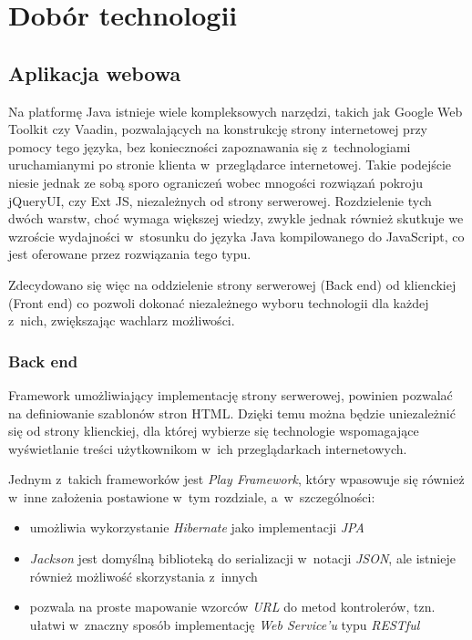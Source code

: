 \documentclass[11pt]{aghdpl}
\begin{document}
\section{Dobór technologii}

\subsection{Aplikacja webowa}

Na platformę Java istnieje wiele kompleksowych narzędzi, takich jak Google Web Toolkit czy Vaadin, pozwalających na konstrukcję strony internetowej przy pomocy tego języka, bez konieczności zapoznawania się z~technologiami uruchamianymi po stronie klienta w~przeglądarce internetowej. Takie podejście niesie jednak ze sobą sporo ograniczeń wobec mnogości rozwiązań pokroju jQueryUI, czy Ext JS, niezależnych od strony serwerowej. Rozdzielenie tych dwóch warstw, choć wymaga większej wiedzy, zwykle jednak również skutkuje we wzroście wydajności w~stosunku do języka Java kompilowanego do JavaScript, co jest oferowane przez rozwiązania tego typu.

Zdecydowano się więc na oddzielenie strony serwerowej (Back end) od klienckiej (Front end) co pozwoli dokonać niezależnego wyboru technologii dla każdej z~nich, zwiększając wachlarz możliwości.

\subsubsection{Back end}

Framework umożliwiający implementację strony serwerowej, powinien pozwalać na definiowanie szablonów stron HTML. Dzięki temu można będzie uniezależnić się od strony klienckiej, dla której wybierze się technologie wspomagające wyświetlanie treści użytkownikom w~ich przeglądarkach internetowych.

Jednym z~takich frameworków jest \emph{Play Framework}, który wpasowuje się również w~inne założenia postawione w~tym rozdziale, a~w~szczególności:

\begin{itemize}
	\item umożliwia wykorzystanie \emph{Hibernate} jako implementacji \emph{JPA}
	\item \emph{Jackson} jest domyślną biblioteką do serializacji w~notacji \emph{JSON}, ale istnieje również możliwość skorzystania z~innych
	\item pozwala na proste mapowanie wzorców \emph{URL} do metod kontrolerów, tzn. ułatwi w~znaczny sposób implementację \emph{Web Service'u} typu \emph{RESTful}
\end{itemize}
\end{document}
